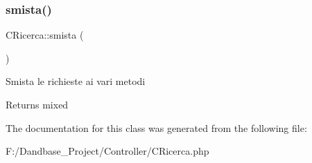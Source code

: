 \subsubsection{\texorpdfstring{smista()}{smista()}}
{\footnotesize\ttfamily C\+Ricerca\+::smista (\begin{DoxyParamCaption}{ }\end{DoxyParamCaption})}

Smista le richieste ai vari metodi

\begin{DoxyReturn}{Returns}
mixed 
\end{DoxyReturn}


The documentation for this class was generated from the following file\+:\begin{DoxyCompactItemize}
\item 
F\+:/\+Dandbase\+\_\+\+Project/\+Controller/C\+Ricerca.\+php\end{DoxyCompactItemize}
